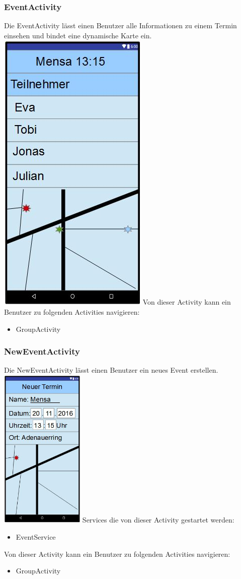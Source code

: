 	\subsubsection {EventActivity}
	Die EventActivity lässt einen Benutzer alle Informationen zu einem Termin einsehen und bindet eine dynamische Karte ein.
	\newline
	\includegraphics[width=.3\textwidth]{GUI_Termin.jpg}
	\newline
	Von dieser Activity kann ein Benutzer zu folgenden Activities navigieren:
	\begin{itemize} 
	 \item GroupActivity 
	 \end{itemize}
	 
	\subsubsection {NewEventActivity}
	Die NewEventActivity lässt einen Benutzer ein neues Event erstellen.
	\newline
	\includegraphics[width=0.3\textwidth]{GUI_NeuerTermin.jpg}
	\newline
	Services die von dieser Activity gestartet werden:
	\begin{itemize}
	\item EventService
	\end{itemize}
	Von dieser Activity kann ein Benutzer zu folgenden Activities navigieren:
	\begin{itemize} 
	 \item GroupActivity
	 \end{itemize}
	 
